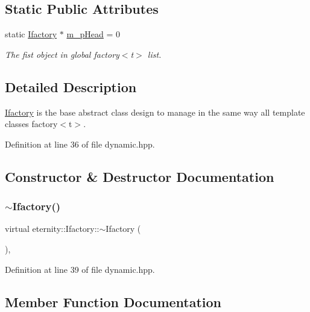\subsection*{Static Public Attributes}
\begin{DoxyCompactItemize}
\item 
static \hyperlink{classeternity_1_1_ifactory}{Ifactory} $\ast$ \hyperlink{classeternity_1_1_ifactory_a106788b385d5f378cb75bfb8f0296525}{m\+\_\+p\+Head} = 0
\begin{DoxyCompactList}\small\item\em The fist object in global factory$<$t$>$ list. \end{DoxyCompactList}\end{DoxyCompactItemize}


\subsection{Detailed Description}
\hyperlink{classeternity_1_1_ifactory}{Ifactory} is the base abstract class design to manage in the same way all template classes factory$<$t$>$. 

Definition at line 36 of file dynamic.\+hpp.



\subsection{Constructor \& Destructor Documentation}
\mbox{\label{classeternity_1_1_ifactory_a5bcc4b3255bd1030562e0e554ece0a05}} 
\subsubsection{\texorpdfstring{$\sim$\+Ifactory()}{~Ifactory()}}
{\footnotesize\ttfamily virtual eternity\+::\+Ifactory\+::$\sim$\+Ifactory (\begin{DoxyParamCaption}{ }\end{DoxyParamCaption})\hspace{0.3cm}{\ttfamily [inline]}, {\ttfamily [virtual]}}



Definition at line 39 of file dynamic.\+hpp.



\subsection{Member Function Documentation}
\mbox{\label{classeternity_1_1_ifactory_afaca5a9abf52fa3a731c3dfed7cb73b3}} 
